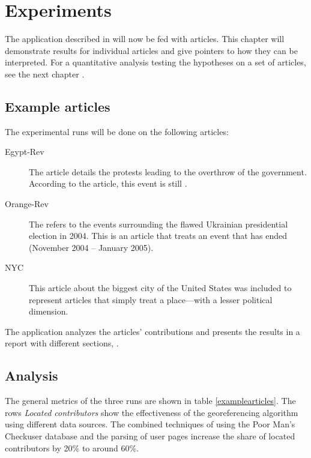 \chapter{Experiments}\label{ch:experiment}

The application described in  will now be fed with articles. 
This chapter will demonstrate results for individual articles and give pointers to how they can be interpreted.
For a quantitative analysis testing the hypotheses on a set of articles, see the next chapter .
\vspace{3em}

\section{Example articles}

The experimental runs will be done on the following articles:

\begin{description}
  \item[Egypt-Rev] The article  details the protests leading to the overthrow of the government.
  According to the article, this event is still .
  \item[Orange-Rev] The  refers to the events surrounding the flawed Ukrainian presidential election in 2004. 
  This is an article that treats an event that has ended (November 2004 -- January 2005).
  \item[NYC] This article about the biggest city of the United States was included to represent articles that simply treat a place---with a lesser political dimension.
\end{description}

The application analyzes the articles' contributions and presents the results in a report with different sections, .

\section{Analysis}

The general metrics of the three runs are shown in table \ref{examplearticles}.
The rows \emph{Located contributors} show the effectiveness of the georeferencing algorithm using different data sources.
The combined techniques of using the Poor Man's Checkuser database and the parsing of user pages increase the share of located contributors by 20\% to around 60\%.

